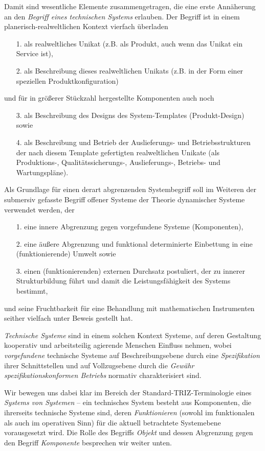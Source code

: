 \documentclass[11pt,a4paper]{article}
\begin{document}
Damit sind wesentliche Elemente zusammengetragen, die eine erste Annäherung an
den \emph{Begriff eines technischen Systems} erlauben.  Der Begriff ist in
einem planerisch-realweltlichen Kontext vierfach überladen
\begin{itemize}
\item [1.] als realweltliches Unikat (z.B. als Produkt, auch wenn das Unikat
  ein Service ist),
\item [2.] als Beschreibung dieses realweltlichen Unikats (z.B. in der Form
  einer speziellen Produktkonfiguration)
\end{itemize}
und für in größerer Stückzahl hergestellte Komponenten auch noch
\begin{itemize}
\item [3.] als Beschreibung des Designs des System-Templates (Produkt-Design)
  sowie
\item [4.] als Beschreibung und Betrieb der Auslieferungs- und
  Betriebsstrukturen der nach diesem Template gefertigten realweltlichen
  Unikate (als Produktions-, Qualitätssicherungs-, Auslieferungs-, Betriebs-
  und Wartungspläne).
\end{itemize}
Als Grundlage für einen derart abgrenzenden Systembegriff soll im Weiteren der
submersiv gefasste Begriff offener Systeme der Theorie dynamischer Systeme
\cite{Bertalanffy1950} verwendet werden, der
\begin{itemize}
\item [1.] eine innere Abgrenzung gegen vorgefundene Systeme (Komponenten), 
\item [2.] eine äußere Abgrenzung und funktional determinierte Einbettung in
  eine (funktionierende) Umwelt sowie
\item [3.] einen (funktionierenden) externen Durchsatz postuliert, der zu
  innerer Strukturbildung führt und damit die Leistungsfähigkeit des Systems
  bestimmt,
\end{itemize}
und seine Fruchtbarkeit für eine Behandlung mit mathematischen Instrumenten
seither vielfach unter Beweis gestellt hat.  

\emph{Technische Systeme} sind in einem solchen Kontext Systeme, auf deren
Gestaltung kooperativ und arbeitsteilig agierende Menschen Einfluss nehmen,
wobei \emph{vorgefundene} technische Systeme auf Beschreibungsebene durch eine
\emph{Spezifikation} ihrer Schnittstellen und auf Vollzugsebene durch die
\emph{Gewähr spezifikationskonformen Betriebs} normativ charakterisiert sind.

Wir bewegen uns dabei klar im Bereich der Standard-TRIZ-Terminologie eines
\emph{Systems von Systemen} -- ein technisches System besteht aus Komponenten,
die ihrerseits technische Systeme sind, deren \emph{Funktionieren} (sowohl im
funktionalen als auch im operativen Sinn) für die aktuell betrachtete
Systemebene vorausgesetzt wird. Die Rolle des Begriffs \emph{Objekt} und
dessen Abgrenzung gegen den Begriff \emph{Komponente} besprechen wir weiter
unten. 
\end{document}
